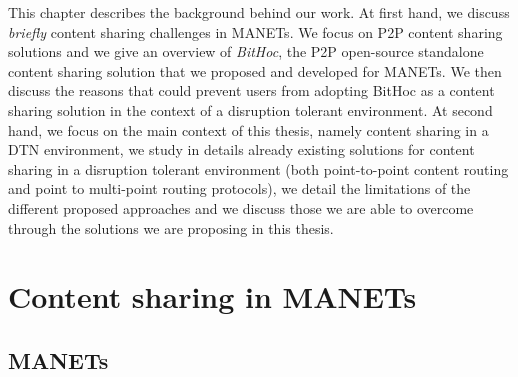 This chapter describes the background behind our work. At first hand, we discuss \emph{briefly} content sharing challenges in MANETs. We focus on P2P content sharing solutions and we give an overview of \emph{BitHoc}, the P2P open-source standalone content sharing solution that we proposed and developed for MANETs. We then discuss the reasons that could prevent users from adopting BitHoc as a content sharing solution in the context of a disruption tolerant environment. At second hand, we focus on the main context of this thesis, namely content sharing in a DTN environment, we study in details already existing solutions for content sharing in a disruption tolerant environment (both point-to-point content routing and point to multi-point routing protocols), we detail the limitations of the different proposed approaches and we discuss those we are able to overcome through the solutions we are proposing in this thesis. 

\section{Content sharing in MANETs}

\subsection{MANETs}

